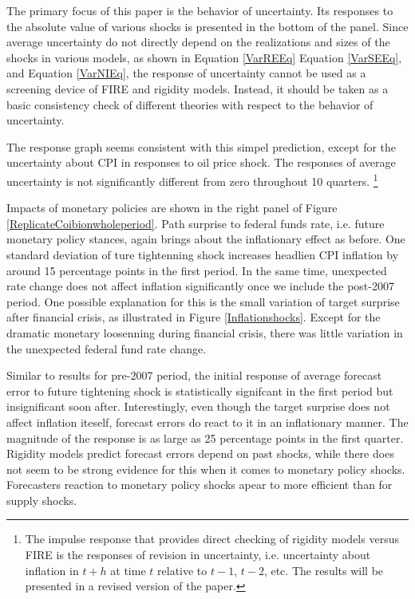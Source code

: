 \documentclass[]{article}
\begin{document}
The primary focus of this paper is the behavior of uncertainty. Its responses to the absolute value of various shocks is presented in the bottom of the panel. Since  average uncertainty do not directly depend on the realizations and sizes of the shocks in various models, as shown in Equation \ref{VarREEq}  Equation \ref{VarSEEq}, and Equation \ref{VarNIEq}, the response of uncertainty cannot be used as a screening device of  FIRE and rigidity models. Instead, it should be taken as a basic consistency check of different theories with respect to the behavior of uncertainty.  

 The response graph seems consistent with this simpel prediction, except for the uncertainty about CPI in responses to oil price shock. The responses of average uncertainty is not significantly different from zero throughout 10 quarters. \footnote{The impulse response that provides direct checking of rigidity models versus FIRE is the responses of revision in uncertainty, i.e. uncertainty about inflation in $t+h$ at time $t$ relative to $t-1$, $t-2$, etc. The results will be presented in a revised version of the paper.} 
 
Impacts of monetary policies are shown in the right panel of Figure \ref{ReplicateCoibionwholeperiod}. Path surprise to federal funds rate, i.e. future monetary policy stances, again brings about the inflationary effect as before. One standard deviation of ture tightenning shock increases headlien CPI inflation by around 15 percentage points in the first period.  In the same time, unexpected rate change does not affect inflation significantly once we include the post-2007 period.  One possible explanation for this is the small variation of target surprise after financial crisis, as illustrated in Figure \ref{Inflationshocks}. Except for the dramatic monetary loosenning during financial crisis, there was little variation in the unexpected federal fund rate change.  

Similar to results for pre-2007 period, the initial response of average forecast error to future tightening shock is statistically signifcant in the first period but insignificant soon after.  Interestingly, even though the target surprise does not affect inflation iteself, forecast errors do react to it in an inflationary manner. The magnitude of the response is as large as 25 percentage points in the first quarter. Rigidity models predict forecast errors depend on past shocks, while there does not seem to be strong evidence for this when it comes to monetary policy shocks. Forecasters reaction to monetary policy shocks apear to more efficient than for supply shocks. 
\end{document}
